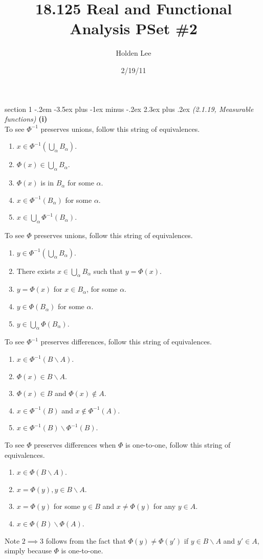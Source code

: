 \documentclass[12pt]{article}
\makeatletter
\theoremstyle{norm}
\newcommand{\nin}[0]{\not\in}
\newcommand{\al}[0]{\alpha}
\newcommand{\pa}[1]{\left( {#1} \right)}
\newcommand{\subprob}[1]{\noindent\textbf{#1}\\}
\newcommand{\bs}[0]{\backslash}
\newenvironment{problem}{\@startsection
       {section}
       {1}
       {-.2em}
       {-3.5ex plus -1ex minus -.2ex}
       {2.3ex plus .2ex}
       {\pagebreak[3]%
       \large\bf\noindent{Problem }
       }
       }
       {%
       }
\makeatother
\begin{document}
\title{18.125 Real and Functional Analysis PSet \#2}%
\author{Holden Lee}
\date{2/19/11}%
\maketitle
\thispagestyle{empty}
\begin{problem}{\it (2.1.19, Measurable functions)}
\subprob{(i)}
To see $\Phi^{-1}$ preserves unions, follow this string of equivalences.
\begin{enumerate}
\item
$x\in \Phi^{-1}\pa{\bigcup_{\al}B_{\al}}$.
\item
$\Phi(x)\in \bigcup_{\al}B_{\al}$.
\item $\Phi(x)$ is in $B_{\al}$ for some $\al$.
\item $x\in \Phi^{-1}(B_\al)$ for some $\al$.
\item $x\in \bigcup_{\al} \Phi^{-1}(B_{\al})$.
\end{enumerate}
To see $\Phi$ preserves unions, follow this string of equivalences.
\begin{enumerate}
\item
$y\in \Phi^{-1}\pa{\bigcup_{\al} B_{\al}}$.
\item
There exists $x\in \bigcup_{\al} B_{\al}$ such that $y=\Phi(x)$.
\item
$y=\Phi(x)$ for $x\in B_{\al}$, for some $\al$.
\item
$y\in \Phi(B_{\al})$ for some $\al$.
\item $y\in \bigcup_{\al}\Phi(B_{\al})$.
\end{enumerate}
To see $\Phi^{-1}$ preserves differences, follow this string of equivalences.
\begin{enumerate}
\item
$x\in \Phi^{-1}(B\bs A)$.
\item
$\Phi(x)\in B\bs A$.
\item
$\Phi(x)\in B$ and $\Phi(x)\nin A$.
\item $x\in \Phi^{-1}(B)$ and $x\nin \Phi^{-1}(A)$.
\item $x\in \Phi^{-1}(B)\bs\Phi^{-1}(B)$.
\end{enumerate}
To see $\Phi$ preserves differences when $\Phi$ is one-to-one,  follow this string of equivalences.
\begin{enumerate}
\item
$x\in \Phi(B\bs A)$.
\item
$x=\Phi(y),y\in B\bs A$.
\item 
$x=\Phi(y)$ for some $y\in B$ and $x\neq \Phi(y)$ for any $y\in A$.
\item
$x\in \Phi(B)\bs \Phi(A)$.
\end{enumerate}
Note $2\implies 3$ follows from the fact that $\Phi(y)\neq \Phi(y')$ if $y\in B\bs A$ and $y'\in A$, simply because $\Phi$ is one-to-one.


\end{problem}
\end{document}
